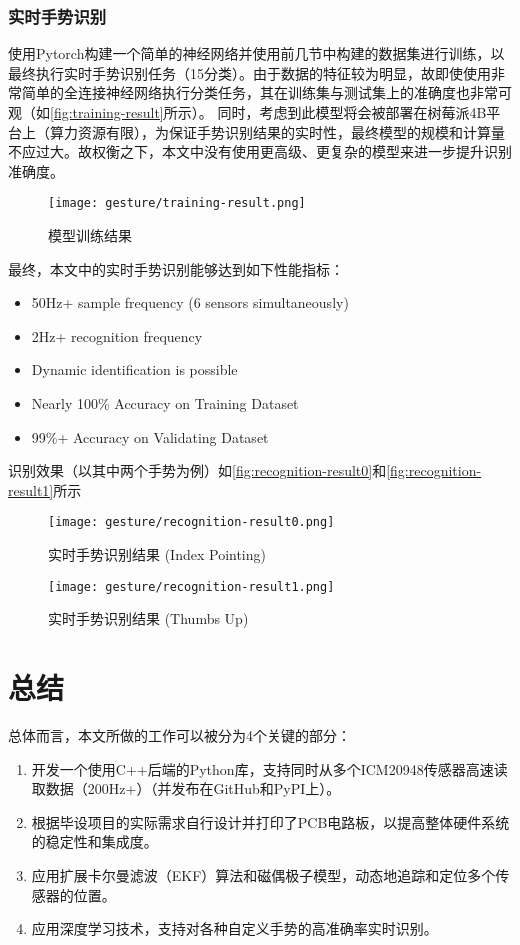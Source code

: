 \subsubsection{实时手势识别}
使用Pytorch构建一个简单的神经网络并使用前几节中构建的数据集进行训练，以最终执行实时手势识别任务（15分类）。由于数据的特征较为明显，故即使使用非常简单的全连接神经网络执行分类任务，其在训练集与测试集上的准确度也非常可观（如\autoref{fig:training-result}所示）。
同时，考虑到此模型将会被部署在树莓派4B平台上（算力资源有限），为保证手势识别结果的实时性，最终模型的规模和计算量不应过大。故权衡之下，本文中没有使用更高级、更复杂的模型来进一步提升识别准确度。

\begin{figure}[H]
    \centering
    \texttt{[image: gesture/training-result.png]}
    \caption{\label{fig:training-result}模型训练结果}
\end{figure}

最终，本文中的实时手势识别能够达到如下性能指标：
\begin{itemize}
    \item 50Hz+ sample frequency (6 sensors simultaneously)
    \item 2Hz+ recognition frequency
    \item Dynamic identification is possible
    \item Nearly 100\% Accuracy on Training Dataset
    \item 99\%+ Accuracy on Validating Dataset
\end{itemize}

识别效果（以其中两个手势为例）如\autoref{fig:recognition-result0}和\autoref{fig:recognition-result1}所示

\begin{figure}[H]
    \centering
    \texttt{[image: gesture/recognition-result0.png]}
    \caption{\label{fig:recognition-result0}实时手势识别结果 (Index Pointing)}
\end{figure}

\begin{figure}[H]
    \centering
    \texttt{[image: gesture/recognition-result1.png]}
    \caption{\label{fig:recognition-result1}实时手势识别结果 (Thumbs Up)}
\end{figure}

\cleardoublepage
\section{总结}
总体而言，本文所做的工作可以被分为4个关键的部分：
\begin{enumerate}[label=(\alph*)]
    \item 开发一个使用C++后端的Python库，支持同时从多个ICM20948传感器高速读取数据（200Hz+）（并发布在GitHub和PyPI上）。
    \item 根据毕设项目的实际需求自行设计并打印了PCB电路板，以提高整体硬件系统的稳定性和集成度。
    \item 应用扩展卡尔曼滤波（EKF）算法和磁偶极子模型，动态地追踪和定位多个传感器的位置。
    \item 应用深度学习技术，支持对各种自定义手势的高准确率实时识别。
\end{enumerate}

